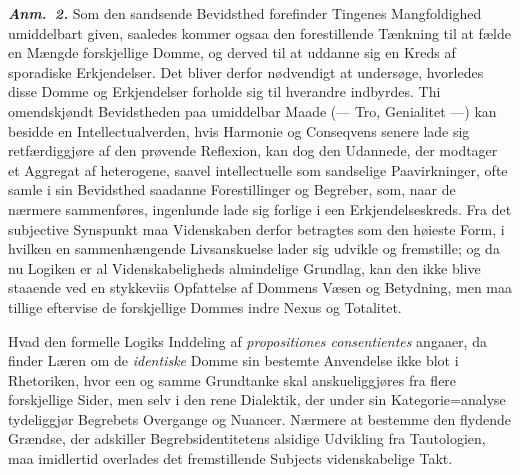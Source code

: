 \documentclass[12pt]{book}
\newcommand{\anm}[1]{\emph{\textbf{Anm.~#1.}}}
\newcommand{\opage}[1]{\marginnote{\footnotesize\textit{[#1]}}}
\begin{document}
\anm{2} Som den sandsende Bevidsthed forefinder Tingenes Mangfoldighed
umiddelbart given, saaledes kommer ogsaa den forestillende Tænkning til at fælde
en Mængde forskjellige Domme, og derved til at uddanne sig en Kreds af sporadiske
Erkjendelser. Det bliver derfor nødvendigt at undersøge, hvorledes disse Domme og
Erkjendelser forholde sig til hverandre indbyrdes. Thi omendskjøndt Bevidstheden
paa umiddelbar Maade (--- Tro, Genialitet ---) kan besidde en Intellectualverden,
hvis Harmonie og Conseqvens senere lade sig retfærdiggjøre af den prøvende
Reflexion, kan dog den
\opage{59} Udannede, der modtager et Aggregat af heterogene, saavel intellectuelle som
sandselige Paavirkninger, ofte samle i sin Bevidsthed saadanne Forestillinger og
Begreber, som, naar de nærmere sammenføres, ingenlunde lade sig forlige i een
Erkjendelseskreds. Fra det subjective Synspunkt maa Videnskaben derfor betragtes
som den høieste Form, i hvilken en sammenhængende Livsanskuelse lader sig udvikle
og fremstille; og da nu Logiken er al Videnskabeligheds almindelige Grundlag, kan
den ikke blive staaende ved en stykkeviis Opfattelse af Dommens Væsen og
Betydning, men maa tillige eftervise de forskjellige Dommes indre Nexus og
Totalitet.

Hvad den formelle Logiks Inddeling af \textit{propositiones consentientes}
angaaer, da finder Læren om de \emph{identiske} Domme sin bestemte Anvendelse ikke
blot i Rhetoriken, hvor een og samme Grundtanke skal anskueliggjøres fra flere
forskjellige Sider, men selv i den rene Dialektik, der under sin
Kategorie=analyse tydeliggjør Begrebets Overgange og Nuancer. Nærmere at bestemme
den flydende Grændse, der adskiller Begrebsidentitetens alsidige Udvikling fra
Tautologien, maa imidlertid overlades det fremstillende Subjects videnskabelige
Takt.
\end{document}
